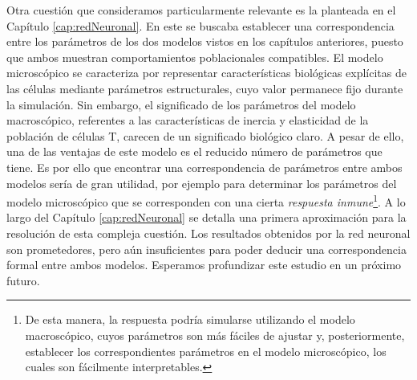 Otra cuestión que consideramos particularmente relevante es la planteada en el Capítulo \ref{cap:redNeuronal}. En este se buscaba establecer una correspondencia entre los parámetros de los dos modelos vistos en los capítulos anteriores, puesto que ambos muestran comportamientos poblacionales compatibles. El modelo microscópico se caracteriza por representar características biológicas explícitas de las células mediante parámetros estructurales, cuyo valor permanece fijo durante la simulación. Sin embargo, el significado de los parámetros del modelo macroscópico, referentes a las características de inercia y elasticidad de la población de células T, carecen de un significado biológico claro. A pesar de ello, una de las ventajas de este modelo es el reducido número de parámetros que tiene. Es por ello que encontrar una correspondencia de parámetros entre ambos modelos sería de gran utilidad, por ejemplo para determinar los parámetros del modelo microscópico que se corresponden con una cierta \textit{respuesta inmune}\footnote{De esta manera, la respuesta podría simularse utilizando el modelo macroscópico, cuyos parámetros son más fáciles de ajustar y, posteriormente, establecer los correspondientes parámetros en el modelo microscópico, los cuales son fácilmente interpretables.}. A lo largo del Capítulo  \ref{cap:redNeuronal} se detalla una primera aproximación para la resolución de esta compleja cuestión. Los resultados obtenidos por la red neuronal son prometedores, pero aún insuficientes para poder deducir una correspondencia formal entre ambos modelos. Esperamos profundizar este estudio en un próximo futuro.


